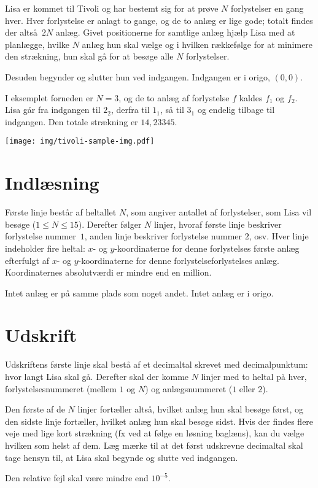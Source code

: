 
Lisa er kommet til Tivoli og har bestemt sig for at prøve $N$ forlystelser en gang hver.
Hver forlystelse er anlagt to gange, og de to anlæg er lige gode; totalt findes der altså $2N$ anlæg.
Givet positionerne for samtlige anlæg hjælp Lisa med at planlægge, hvilke $N$ anlæg hun skal vælge og i hvilken rækkefølge for at minimere den strækning, hun skal gå for at besøge alle $N$ forlystelser.

Desuden begynder og slutter hun ved indgangen.
Indgangen er i origo, $(0,0)$.

I eksemplet forneden er $N=3$, og de to anlæg af forlystelse $f$ kaldes $f_1$ og $f_2$.
Lisa går fra indgangen til $2_2$, derfra til $1_1$, så til $3_1$ og endelig tilbage til indgangen.
Den totale strækning er $14{,}23345$.

\bigskip
\begin{center}
\texttt{[image: img/tivoli-sample-img.pdf]}
\end{center}

\section*{Indlæsning}
Første linje består af heltallet $N$, som angiver antallet af forlystelser, som Lisa vil besøge ($1 \le N \le 15$).
Derefter følger $N$ linjer, hvoraf første linje beskriver forlystelse  nummer~$1$, anden linje beskriver forlystelse nummer $2$, osv.
Hver linje indeholder fire heltal: $x$- og $y$-koordinaterne for denne forlystelses første anlæg efterfulgt af $x$- og $y$-koordinaterne for denne forlystelseforlystelses anlæg.
Koordinaternes absolutværdi er mindre end en million.

Intet anlæg er på samme plads som noget andet.
Intet anlæg er i origo.

\section*{Udskrift}
Udskriftens første linje skal bestå af et decimaltal skrevet med decimalpunktum: hvor langt Lisa skal gå. 
Derefter skal der komme $N$ linjer med to heltal på hver, forlystelsesnummeret (mellem $1$ og $N$) og anlægsnummeret ($1$ eller $2$).

Den første af de $N$ linjer fortæller altså, hvilket anlæg hun skal besøge først, og den sidste linje fortæller, hvilket anlæg hun skal besøge sidst.
Hvis der findes flere veje med lige kort strækning (fx ved at følge en løsning baglæns), kan du vælge hvilken som helst af dem.
Læg mærke til at det først udskrevne decimaltal skal tage hensyn til, at Lisa skal begynde og slutte ved indgangen.

Den relative fejl skal være mindre end $10^{-5}$.
